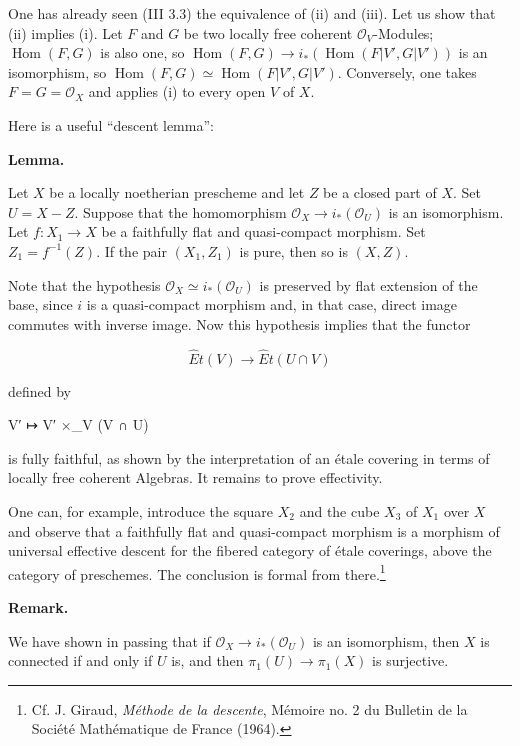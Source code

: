 \documentclass[
]{article}
\newenvironment{Shaded}{}{}
\newcommand{\NormalTok}[1]{#1}
\begin{document}
One has already seen (III 3.3) the equivalence of (ii) and (iii). Let us
show that (ii) implies (i). Let \(F\) and \(G\) be two locally free
coherent \(\mathcal{O}_{V}\)-Modules; \(\operatorname{Hom}(F, G)\) is
also one, so
\(\operatorname{Hom}(F, G) \to i_{*}(\operatorname{Hom}(F|V', G|V'))\)
is an isomorphism, so
\(\operatorname{Hom}(F, G) \simeq \operatorname{Hom}(F|V', G|V')\).
Conversely, one takes \(F = G = \mathcal{O}_{X}\) and applies (i) to
every open \(V\) of \(X\).

Here is a useful ``descent lemma'':

\textbf{Lemma.}

Let \(X\) be a locally noetherian prescheme and let \(Z\) be a closed
part of \(X\). Set \(U = X - Z\). Suppose that the homomorphism
\(\mathcal{O}_{X} \to i_{*}(\mathcal{O}_{U})\) is an isomorphism. Let
\(f: X_{1} \to X\) be a faithfully flat and quasi-compact morphism. Set
\(Z_{1} = f^{-1}(Z)\). If the pair \((X_{1}, Z_{1})\) is pure, then so
is \((X, Z)\).

Note that the hypothesis
\(\mathcal{O}_{X} \simeq i_{*}(\mathcal{O}_{U})\) is preserved by flat
extension of the base, since \(i\) is a quasi-compact morphism and, in
that case, direct image commutes with inverse image. Now this hypothesis
implies that the functor

\[
\hat{E}t(V) \longrightarrow \hat{E}t(U \cap V)
\]

defined by

\begin{Shaded}
\begin{Highlighting}[]
\NormalTok{V′ ↦ V′ ×\_V (V ∩ U)}
\end{Highlighting}
\end{Shaded}

is fully faithful, as shown by the interpretation of an étale covering
in terms of locally free coherent Algebras. It remains to prove
effectivity.

One can, for example, introduce the square \(X_{2}\) and the cube
\(X_{3}\) of \(X_{1}\) over \(X\) and observe that a faithfully flat and
quasi-compact morphism is a morphism of universal effective descent for
the fibered category of étale coverings, above the category of
preschemes. The conclusion is formal from there.\footnote{Cf. J. Giraud,
  \emph{Méthode de la descente}, Mémoire no. 2 du Bulletin de la Société
  Mathématique de France (1964).}

\textbf{Remark.}

We have shown in passing that if
\(\mathcal{O}_{X} \to i_{*}(\mathcal{O}_{U})\) is an isomorphism, then
\(X\) is connected if and only if \(U\) is, and then
\(\pi_{1}(U) \to \pi_{1}(X)\) is surjective.
\end{document}
